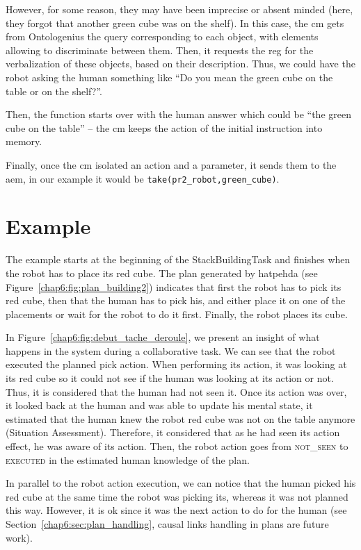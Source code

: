\documentclass[a4paper,11pt,twoside]{StyleThese}
\begin{document}
However, for some reason, they may have been imprecise or absent minded (\eg here, they forgot that another green cube was on the shelf). In this case, the \acrshort{cm} gets from Ontologenius the \sparql{} query corresponding to each object, with elements allowing to discriminate between them. Then, it requests the \acrshort{reg} for the verbalization of these objects, based on their \sparql{} description. Thus, we could have the robot asking the human something like ``Do you mean the green cube on the table or on the shelf?''. 

Then, the function starts over with the human answer which could be ``the green cube on the table'' -- the \acrshort{cm} keeps the action of the initial instruction into memory.

Finally, once the \acrshort{cm} isolated an action and a parameter, it sends them to the \acrlong{aem}, in our example it would be \verb'take(pr2_robot,green_cube)'.

\section{Example}\label{chap6:sec:example}
\thispagestyle{example}
The example starts at the beginning of the StackBuildingTask and finishes when the robot has to place its red cube. The plan generated by \acrshort{hatpehda} (see Figure~\ref{chap6:fig:plan_building2}) indicates that first the robot has to pick its red cube, then that the human has to pick his, and either place it on one of the placements or wait for the robot to do it first. Finally, the robot places its cube. 

In Figure~\ref{chap6:fig:debut_tache_deroule}, we present an insight of what happens in the system during a collaborative task. We can see that the robot executed the planned pick action. When performing its action, it was looking at its red cube so it could not see if the human was looking at its action or not. Thus, it is considered that the human had not seen it. Once its action was over, it looked back at the human and was able to update his mental state, \ie it estimated that the human knew the robot red cube was not on the table anymore (Situation Assessment). Therefore, it considered that as he had seen its action effect, he was aware of its action. Then, the robot action goes from \textsc{not\_seen} to \textsc{executed} in the estimated human knowledge of the plan. 

In parallel to the robot action execution, we can notice that the human picked his red cube at the same time the robot was picking its, whereas it was not planned this way. However, it is ok since it was the next action to do for the human (see Section~\ref{chap6:sec:plan_handling}, causal links handling in plans are future work). 
\end{document}
